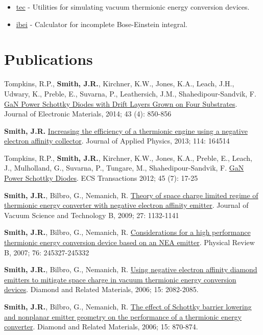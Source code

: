 \begin{itemize}
\item
  \href{http://jrsmith3.github.io/tec/}{tec} - Utilities for simulating
  vacuum thermionic energy conversion devices.
\item
  \href{http://ibei.readthedocs.org/en/latest/}{ibei} - Calculator for
  incomplete Bose-Einstein integral.
\end{itemize}

\section{Publications}

Tompkins, R.P., \textbf{Smith, J.R.}, Kirchner, K.W., Jones, K.A.,
Leach, J.H., Udwary, K., Preble, E., Suvarna, P., Leathersich, J.M.,
Shahedipour-Sandvik, F.
\href{http://dx.doi.org/10.1007/s11664-014-3021-9}{GaN Power Schottky
Diodes with Drift Layers Grown on Four Substrates}. Journal of
Electronic Materials, 2014; 43 (4): 850-856

\textbf{Smith, J.R.}
\href{http://dx.doi.org/10.1063/1.4826202}{Increasing the efficiency of
a thermionic engine using a negative electron affinity collector}.
Journal of Applied Physics, 2013; 114: 164514

Tompkins, R.P., \textbf{Smith, J.R.}, Kirchner, K.W., Jones, K.A.,
Preble, E., Leach, J., Mulholland, G., Suvarna, P., Tungare, M.,
Shahedipour-Sandvik, F. \href{http://dx.doi.org/10.1149/1.3701521}{GaN
Power Schottky Diodes}. ECS Transactions 2012; 45 (7): 17-25

\textbf{Smith, J.R.}, Bilbro, G., Nemanich, R.
\href{http://dx.doi.org/10.1116/1.3125282}{Theory of space charge
limited regime of thermionic energy converter with negative electron
affinity emitter}. Journal of Vacuum Science and Technology B, 2009; 27:
1132-1141

\textbf{Smith, J.R.}, Bilbro, G., Nemanich, R.
\href{http://dx.doi.org/10.1103/PhysRevB.76.245327}{Considerations for a
high performance thermionic energy conversion device based on an NEA
emitter}. Physical Review B, 2007; 76: 245327-245332

\textbf{Smith, J.R.}, Bilbro, G., Nemanich, R.
\href{http://dx.doi.org/10.1016/j.diamond.2006.09.011}{Using negative
electron affinity diamond emitters to mitigate space charge in vacuum
thermionic energy conversion devices}. Diamond and Related Materials,
2006; 15: 2082-2085.

\textbf{Smith, J.R.}, Bilbro, G., Nemanich, R.
\href{http://dx.doi.org/10.1016/j.diamond.2005.12.057}{The effect of
Schottky barrier lowering and nonplanar emitter geometry on the
performance of a thermionic energy converter}. Diamond and Related
Materials, 2006; 15: 870-874.

